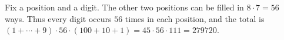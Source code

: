 Fix a position and a digit. The other two positions can be filled in $8\cdot7=56$ ways. Thus every digit occurs $56$ times in each position, and the total is $(1+\cdots+9)\cdot56\cdot(100+10+1)=45\cdot56\cdot111=\boxed{279720}$.
